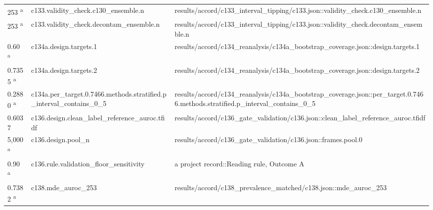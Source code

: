 \begin{longtable}{@{}p{0.7in}p{1.9in}p{2.6in}@{}}
253 \textsuperscript{a} & c133.\allowbreak{}validity\_check.\allowbreak{}c130\_ensemble.\allowbreak{}n & results/\allowbreak{}accord/\allowbreak{}c133\_interval\_tipping/\allowbreak{}c133.\allowbreak{}json::validity\_check.\allowbreak{}c130\_ensemble.\allowbreak{}n\\
253 \textsuperscript{a} & c133.\allowbreak{}validity\_check.\allowbreak{}decontam\_ensemble.\allowbreak{}n & results/\allowbreak{}accord/\allowbreak{}c133\_interval\_tipping/\allowbreak{}c133.\allowbreak{}json::validity\_check.\allowbreak{}decontam\_ensemble.\allowbreak{}n\\
0.60 \textsuperscript{a} & c134a.\allowbreak{}design.\allowbreak{}targets.\allowbreak{}1 & results/\allowbreak{}accord/\allowbreak{}c134\_reanalysis/\allowbreak{}c134a\_bootstrap\_coverage.\allowbreak{}json::design.\allowbreak{}targets.\allowbreak{}1\\
0.7355 \textsuperscript{a} & c134a.\allowbreak{}design.\allowbreak{}targets.\allowbreak{}2 & results/\allowbreak{}accord/\allowbreak{}c134\_reanalysis/\allowbreak{}c134a\_bootstrap\_coverage.\allowbreak{}json::design.\allowbreak{}targets.\allowbreak{}2\\
0.2880 \textsuperscript{a} & c134a.\allowbreak{}per\_target.\allowbreak{}0.\allowbreak{}7466.\allowbreak{}methods.\allowbreak{}stratified.\allowbreak{}p\_interval\_contains\_0\_5 & results/\allowbreak{}accord/\allowbreak{}c134\_reanalysis/\allowbreak{}c134a\_bootstrap\_coverage.\allowbreak{}json::per\_target.\allowbreak{}0.\allowbreak{}7466.\allowbreak{}methods.\allowbreak{}stratified.\allowbreak{}p\_interval\_contains\_0\_5\\
0.6037 & c136.\allowbreak{}design.\allowbreak{}clean\_label\_reference\_auroc.\allowbreak{}tfidf & results/\allowbreak{}accord/\allowbreak{}c136\_gate\_validation/\allowbreak{}c136.\allowbreak{}json::clean\_label\_reference\_auroc.\allowbreak{}tfidf\\
5,000 \textsuperscript{a} & c136.\allowbreak{}design.\allowbreak{}pool\_n & results/\allowbreak{}accord/\allowbreak{}c136\_gate\_validation/\allowbreak{}c136.\allowbreak{}json::frames.\allowbreak{}pool.\allowbreak{}0\\
0.90 \textsuperscript{a} & c136.\allowbreak{}rule.\allowbreak{}validation\_floor\_sensitivity & a project record::Reading rule, Outcome A\\
0.7382 \textsuperscript{a} & c138.\allowbreak{}mde\_auroc\_253 & results/\allowbreak{}accord/\allowbreak{}c138\_prevalence\_matched/\allowbreak{}c138.\allowbreak{}json::mde\_auroc\_253\\

\end{longtable}
